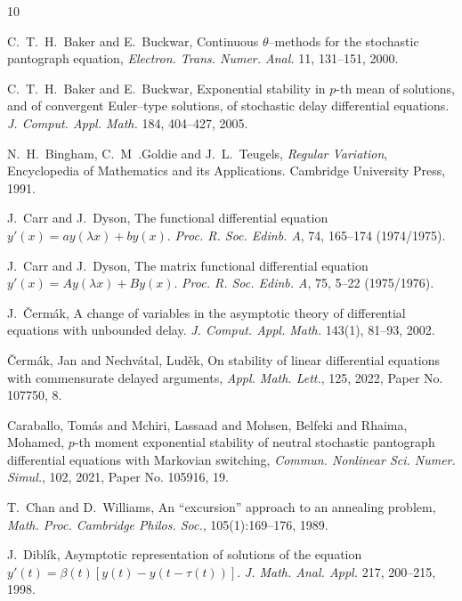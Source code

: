 \documentclass[a4paper,10pt,reqno]{amsart}
\numberwithin{equation}{section}
\theoremstyle{definition}
\theoremstyle{remark}
\DeclareMathOperator{\1}{\mathbbm 1}
\begin{document}
\begin{thebibliography}{10}

C.~T.~H.~Baker and E.~Buckwar, Continuous $\theta$--methods for the stochastic pantograph equation, {\em Electron. Trans. Numer. Anal.} 11, 131--151, 2000.

C.~T.~H.~Baker and E.~Buckwar, Exponential stability in $p$-th mean of solutions, and of convergent Euler--type solutions, of stochastic delay differential equations. {\em J. Comput. Appl. Math.} 184, 404--427, 2005.

N.~H.~Bingham, C.~M~.Goldie and J.~L.~Teugels, {\em Regular Variation},  Encyclopedia of Mathematics and its Applications. Cambridge University Press, 1991.

J.~Carr and J.~Dyson, The functional differential equation $y'(x) = ay(\lambda x) + by(x)$. {\em Proc. R. Soc. Edinb. A}, 74, 165--174 (1974/1975).

J.~Carr and J.~Dyson, The matrix functional differential equation $y'(x) = Ay(\lambda x) + By(x)$. {\em Proc. R. Soc. Edinb. A}, 75, 5--22 (1975/1976).

J.~\v Cerm\'ak, A change of variables in the asymptotic theory of differential equations with unbounded delay. {\em J. Comput. Appl. Math.} 143(1), 81--93, 2002.	

\v Cerm\'ak, Jan and Nechv\'atal, Lud\v ek, On stability of linear differential equations with
commensurate delayed arguments, {\em Appl. Math. Lett.}, 125, 2022, Paper No. 107750, 8.

 Caraballo, Tom\'as and Mchiri, Lassaad and Mohsen, Belfeki and
Rhaima, Mohamed, $p$-th moment exponential stability of neutral stochastic
pantograph differential equations with {M}arkovian switching, {\em Commun. Nonlinear Sci. Numer. Simul.}, 102, 2021, Paper No. 105916, 19.

T.~Chan and D.~Williams, An ``excursion'' approach to an annealing problem, {\em Math. Proc. Cambridge Philos. Soc.}, 105(1):169--176, 1989.

J.~Dibl\'ik, Asymptotic representation of solutions of the equation $y'(t) = \beta(t)[y(t) - y(t - \tau(t))]$.
{\em J. Math. Anal. Appl.} 217, 200--215, 1998.


\end{thebibliography}
\end{document}

